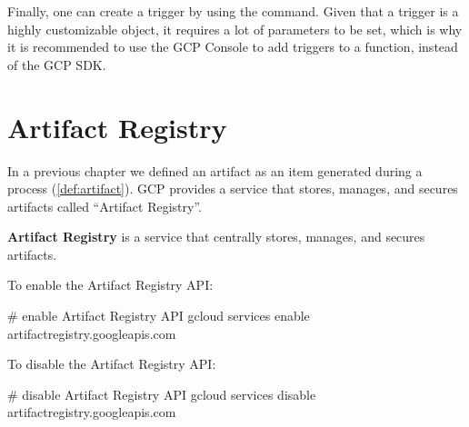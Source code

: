 Finally, one can create a trigger by using the  command. Given that a trigger is a
highly customizable object, it requires a lot of parameters to be set, which is why it is recommended to use the GCP
Console to add triggers to a function, instead of the GCP SDK\@.

\section{Artifact Registry}\label{sec:artifact_registry}

In a previous chapter we defined an artifact as an item generated during a process (\ref{def:artifact}). GCP provides a
service that stores, manages, and secures artifacts called ``Artifact Registry''.

\textbf{Artifact Registry} is a service that centrally stores, manages, and secures artifacts.
\ed

To enable the Artifact Registry API:
\begin{bash}
# enable Artifact Registry API
gcloud services enable artifactregistry.googleapis.com
\end{bash}

To disable the Artifact Registry API:
\begin{bash}
# disable Artifact Registry API
gcloud services disable artifactregistry.googleapis.com
\end{bash}


